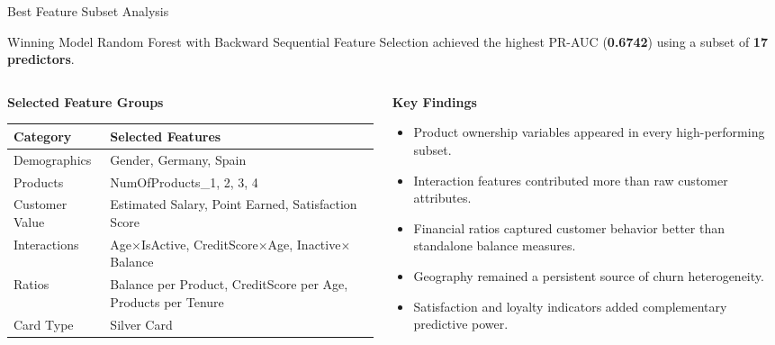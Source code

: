 \begin{frame}{Best Feature Subset Analysis}

\begin{block}{Winning Model}
\scriptsize
Random Forest with Backward Sequential Feature Selection achieved the highest
PR-AUC (\textbf{0.6742}) using a subset of \textbf{17 predictors}.
\end{block}

\scriptsize

\begin{columns}[T]

\begin{column}{0.45\textwidth}

\textbf{Selected Feature Groups}

\scriptsize
\begin{tabular}{p{1.7cm} p{3.3cm}}
\hline
\textbf{Category} & \textbf{Selected Features} \\
\hline
Demographics &
Gender, Germany, Spain \\

Products &
NumOfProducts\_1, 2, 3, 4 \\

Customer Value &
Estimated Salary, Point Earned, Satisfaction Score \\

Interactions &
Age$\times$IsActive,
CreditScore$\times$Age,
Inactive$\times$Balance \\

Ratios &
Balance per Product,
CreditScore per Age,
Products per Tenure \\

Card Type &
Silver Card \\
\hline
\end{tabular}

\end{column}

\begin{column}{0.55\textwidth}

\textbf{Key Findings}

\begin{itemize}
\footnotesize
\item Product ownership variables appeared in every high-performing subset.

\item Interaction features contributed more than raw customer attributes.

\item Financial ratios captured customer behavior better than standalone balance measures.

\item Geography remained a persistent source of churn heterogeneity.

\item Satisfaction and loyalty indicators added complementary predictive power.
\end{itemize}

\end{column}

\end{columns}

\end{frame}